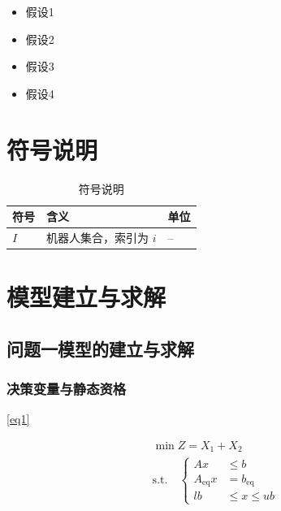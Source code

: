 \documentclass[withoutpreface,bwprint]{cumcmthesis}
\begin{document}
\begin{itemize}[itemindent=2em]
\item 假设1
\item 假设2
\item 假设3
\item 假设4
\end{itemize}


\section{符号说明}
\begin{table}[H]
\centering
\caption{符号说明}
\label{tab:symbols}
\begin{tabularx}{0.98\textwidth}{@{}>{\centering\arraybackslash}p{} >{\raggedright\arraybackslash}X >{\centering\arraybackslash}p{}@{}}
    \toprule
    \textbf{符号} & \textbf{含义} & \textbf{单位} \\\midrule
    $I$ & 机器人集合，索引为 $i$ & -- \\
    \bottomrule
\end{tabularx}
\end{table}


\section{模型建立与求解}

\subsection{问题一模型的建立与求解}

\subsubsection{决策变量与静态资格}

\cref{eq1}
\begin{center}

\begin{equation}\label{eq1}
\begin{aligned}
&\min Z = X_1 + X_2 \\
&\text{s.t.} \quad 
\left\{
\begin{aligned}
A x &\leq b \\
A_{\mathrm{eq}} x &= b_{\mathrm{eq}} \\
lb &\leq x \leq ub
\end{aligned}
\right.
\end{aligned}
\end{equation}
\end{center}
\end{document}
